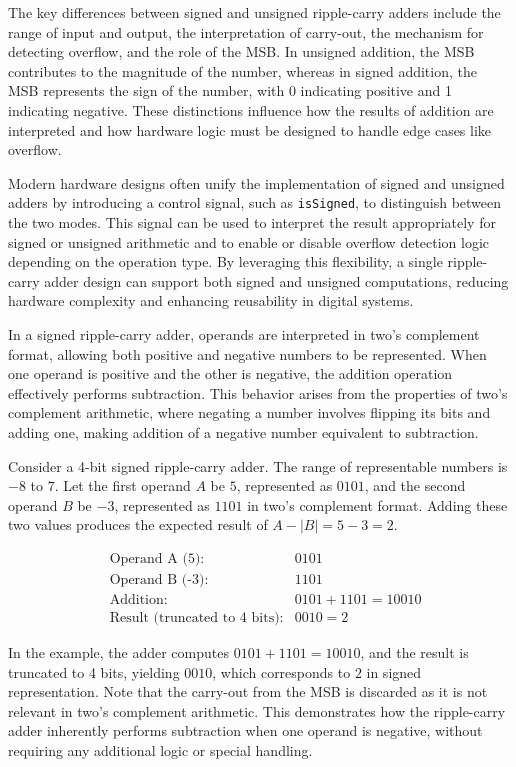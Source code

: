 {The key differences between signed and unsigned ripple-carry adders include the range of input and output, the interpretation of carry-out, the mechanism for detecting overflow, and the role of the MSB. In unsigned addition, the MSB contributes to the magnitude of the number, whereas in signed addition, the MSB represents the sign of the number, with 0 indicating positive and 1 indicating negative. These distinctions influence how the results of addition are interpreted and how hardware logic must be designed to handle edge cases like overflow.

Modern hardware designs often unify the implementation of signed and unsigned adders by introducing a control signal, such as \texttt{isSigned}, to distinguish between the two modes. This signal can be used to interpret the result appropriately for signed or unsigned arithmetic and to enable or disable overflow detection logic depending on the operation type. By leveraging this flexibility, a single ripple-carry adder design can support both signed and unsigned computations, reducing hardware complexity and enhancing reusability in digital systems.

In a signed ripple-carry adder, operands are interpreted in two's complement format, allowing both positive and negative numbers to be represented. When one operand is positive and the other is negative, the addition operation effectively performs subtraction. This behavior arises from the properties of two's complement arithmetic, where negating a number involves flipping its bits and adding one, making addition of a negative number equivalent to subtraction. 

Consider a 4-bit signed ripple-carry adder. The range of representable numbers is \( -8 \) to \( 7 \). Let the first operand \( A \) be \( 5 \), represented as \( 0101 \), and the second operand \( B \) be \( -3 \), represented as \( 1101 \) in two's complement format. Adding these two values produces the expected result of \( A - |B| = 5 - 3 = 2 \).

\[
\begin{aligned}
&\text{Operand A (5):} & 0101 \\
&\text{Operand B (-3):} & 1101 \\
&\text{Addition:} & 0101 + 1101 = 10010 \\
&\text{Result (truncated to 4 bits):} & 0010 = 2
\end{aligned}
\]

In the example, the adder computes \( 0101 + 1101 = 10010 \), and the result is truncated to 4 bits, yielding \( 0010 \), which corresponds to \( 2 \) in signed representation. Note that the carry-out from the MSB is discarded as it is not relevant in two's complement arithmetic. This demonstrates how the ripple-carry adder inherently performs subtraction when one operand is negative, without requiring any additional logic or special handling.

}

